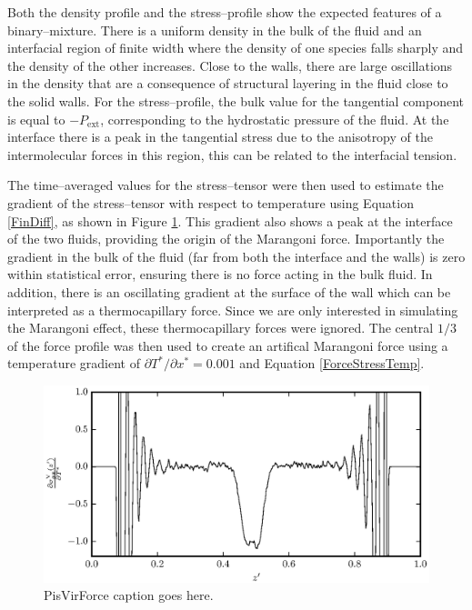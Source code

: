 Both the density profile and the stress--profile show the expected features of a binary--mixture. 
There is a uniform density in the bulk of the fluid and an interfacial region of finite width where the density of one species falls sharply and the density of the other increases.
Close to the walls, there are large oscillations in the density that are a consequence of structural layering in the fluid close to the solid walls.
For the stress--profile, the bulk value for the tangential component is equal to $-P_{\mathrm{ext}}$, corresponding to the hydrostatic pressure of the fluid.
At the interface there is a peak in the tangential stress due to the anisotropy of the intermolecular forces in this region, this can be related to the interfacial tension.\cite{Marchand2011}

\FloatBarrier
The time--averaged values for the stress--tensor were then used to estimate the gradient of the stress--tensor with respect to temperature using Equation \ref{FinDiff}, as shown in Figure \ref{PisVirForce}.
This gradient also shows a peak at the interface of the two fluids, providing the origin of the  Marangoni force.
Importantly the gradient in the bulk of the fluid (far from both the interface and the walls) is zero within statistical error, ensuring there is no force acting in the bulk fluid.
In addition, there is an oscillating gradient at the surface of the wall which can be interpreted as a thermocapillary force.
Since we are only interested in simulating the Marangoni effect, these thermocapillary forces were ignored.
The central $1/3$ of the force profile was then used to create an artifical Marangoni force using a temperature gradient of $\partial T^{*} / \partial x^{*} = 0.001$ and Equation \ref{ForceStressTemp}.

\begin{figure}[h]
\centering
\includegraphics[scale=0.8]{PisVirForce}
\caption{PisVirForce caption goes here.}
\label{PisVirForce}
\end{figure}
\FloatBarrier

